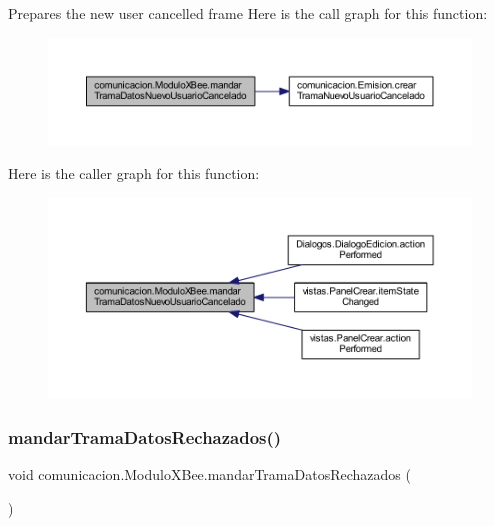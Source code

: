 Prepares the new user cancelled frame Here is the call graph for this function\+:
\nopagebreak
\begin{figure}[H]
\begin{center}
\leavevmode
\includegraphics[width=350pt]{classcomunicacion_1_1_modulo_x_bee_a965cdd2756d507c8c80eade0bf34d06e_cgraph}
\end{center}
\end{figure}
Here is the caller graph for this function\+:
\nopagebreak
\begin{figure}[H]
\begin{center}
\leavevmode
\includegraphics[width=350pt]{classcomunicacion_1_1_modulo_x_bee_a965cdd2756d507c8c80eade0bf34d06e_icgraph}
\end{center}
\end{figure}
\mbox{\label{classcomunicacion_1_1_modulo_x_bee_ac996e20c06c0e1c33f868e33d13f083b}} 
\subsubsection{\texorpdfstring{mandar\+Trama\+Datos\+Rechazados()}{mandarTramaDatosRechazados()}}
{\footnotesize\ttfamily void comunicacion.\+Modulo\+X\+Bee.\+mandar\+Trama\+Datos\+Rechazados (\begin{DoxyParamCaption}{ }\end{DoxyParamCaption})}

